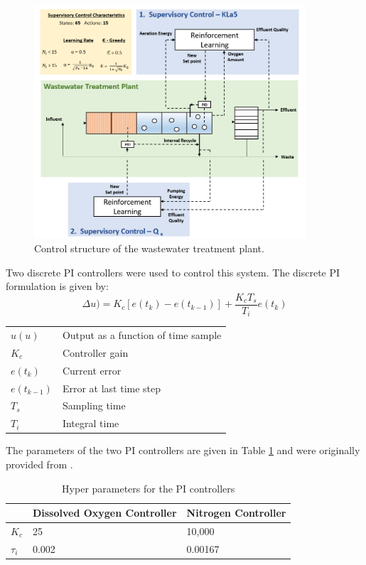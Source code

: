 \begin{figure}[H]
    \centering
    \includegraphics[width=0.9\textwidth]{images/ch4/supervisory_control.png}
    \caption{Control structure of the wastewater treatment plant.}
    \label{fig:04wwtp_rl}
\end{figure}

Two discrete PI controllers were used to control this system.  The discrete PI formulation is given by:
\begin{equation}
    \Delta u) = K_c[e(t_k) - e(t_{k-1})] + \dfrac{K_cT_s}{T_i}e(t_k)
    \label{eq:04discrete_pid}
\end{equation}
\begin{table}[H]
	\begin{tabular}{p{1.5cm}p{6.5cm}}
	$u(u)$ & Output as a function of time sample \\
	$K_c$ & Controller gain \\
	$e(t_k)$ & Current error \\
	$e(t_{k-1})$ & Error at last time step \\
	$T_s$ & Sampling time \\
	$T_i$ & Integral time \\
	\end{tabular}
\end{table}

The parameters of the two PI controllers are given in Table \ref{tab04:pi_parameters} and were originally provided from \cite{wwtp}.

\begin{table}[h]
	\begin{center}
	\def\arraystretch{1.2}
	\begin{tabular}{p{1.5cm}p{5.5cm}p{5.5cm}}
	\hline
	 & Dissolved Oxygen Controller & Nitrogen Controller \\
	 \hline
	 $K_c$ & 25 & 10,000 \\
	 $\tau_i$ & 0.002 & 0.00167 \\
	\hline
	\end{tabular}
	\end{center}
	\caption{Hyper parameters for the PI controllers}
	\label{tab04:pi_parameters}
\end{table}

